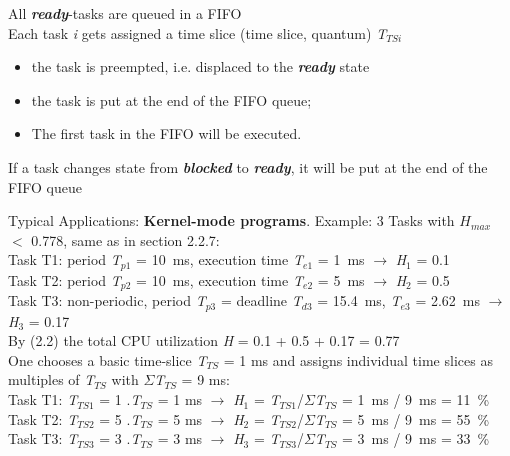 \begin{tcolorbox}[colback=blue!5!white,colframe=blue!75!black]
  All \textbf{\textit{ready}}-tasks are queued in a FIFO \\
  Each task \textit{i} gets assigned a time slice (time slice, quantum) \textit{T${}_{TSi}$}
  \begin{itemize}
		\item  the task is preempted, i.e. displaced to the \textbf{\textit{ready}} state
		\item  the task is put at the end of the FIFO queue;
		\item  The first task in the FIFO will be executed.
	\end{itemize}
  
  If a task changes state from \textbf{\textit{blocked}} to \textbf{\textit{ready}}, it will be put at the end of the FIFO queue
\end{tcolorbox}

Typical Applications: \textbf{Kernel-mode programs}. Example: 3 Tasks with $H_{max}$ $<$ 0.778, same as in section 2.2.7:\\
Task T1: period \textit{T}${}_{p1}$ = 10~ms, execution time \textit{T}${}_{e1}$ = 1~ms $\rightarrow$ \textit{H}${}_{1}$ = 0.1\\
Task T2: period \textit{T}${}_{p2}$ = 10~ms, execution time\textit{ T}${}_{e2}$ = 5~ms $\rightarrow$ \textit{H}${}_{2}$ = 0.5\\
Task T3: non-periodic, period \textit{T}${}_{p3}$ = deadline \textit{T}${}_{d3}$ = 15.4~ms, \textit{T}${}_{e3}$ = 2.62~ms $\rightarrow$ \textit{H}${}_{3}$ = 0.17\\


By (2.2) the total CPU utilization \textit{H} = 0.1 + 0.5 + 0.17 = 0.77 \\

One chooses a basic time-slice \textit{T}${}_{TS}$ = 1 ms and assigns individual time slices as multiples of \textit{T}${}_{TS}$ with $\Sigma$\textit{T}${}_{TS}$ = 9 ms:\\

Task T1:    \textit{T}${}_{TS1}$ = 1 $.$\textit{T}${}_{TS}$ = 1 ms $\rightarrow$ \textit{H}${}_{1}$ = \textit{T}${}_{TS1}$/$\Sigma$\textit{T}${}_{TS}$ = 1~ms / 9~ms = 11~\%\\
Task T2:    \textit{T}${}_{TS2}$ = 5 $.$\textit{T}${}_{TS}$ = 5 ms $\rightarrow$ \textit{H}${}_{2}$ = \textit{T}${}_{TS2}$/$\Sigma$\textit{T}${}_{TS}$ = 5~ms / 9~ms = 55~\%\\
Task T3:     \textit{T}${}_{TS3}$ = 3 $.$\textit{T}${}_{TS}$ = 3 ms $\rightarrow$ \textit{H}${}_{3}$ = \textit{T}${}_{TS3}$/$\Sigma$\textit{T}${}_{TS}$ = 3~ms / 9~ms = 33~\%

